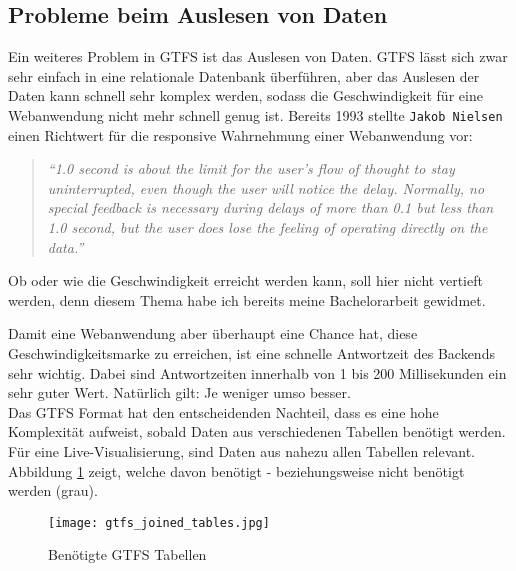 
        \subsection*{Probleme beim Auslesen von Daten}
        \label{sub:subsection_name}
        Ein weiteres Problem in GTFS ist das Auslesen von Daten. GTFS lässt sich zwar sehr einfach in eine relationale Datenbank überführen, aber das Auslesen der Daten kann schnell sehr komplex werden, sodass die Geschwindigkeit für eine Webanwendung nicht mehr schnell genug ist. Bereits 1993 stellte \texttt{Jakob Nielsen} einen Richtwert für die responsive Wahrnehmung einer Webanwendung vor:

        \begin{quote}
          \textit{"`1.0 second is about the limit for the user's flow of thought to stay uninterrupted, even though the user will notice the delay. Normally, no special feedback is necessary during delays of more than 0.1 but less than 1.0 second, but the user does lose the feeling of operating directly on the data."'}\parencite{nielsen}
        \end{quote}

        Ob oder wie die Geschwindigkeit erreicht werden kann, soll hier nicht vertieft werden, denn diesem Thema habe ich bereits meine Bachelorarbeit gewidmet\parencite{lorer}.

        Damit eine Webanwendung aber überhaupt eine Chance hat, diese Geschwindigkeitsmarke zu erreichen, ist eine schnelle Antwortzeit des Backends sehr wichtig. Dabei sind Antwortzeiten innerhalb von 1 bis 200 Millisekunden ein sehr guter Wert. Natürlich gilt: Je weniger umso besser.\\

        Das GTFS Format hat den entscheidenden Nachteil, dass es eine hohe Komplexität aufweist, sobald Daten aus verschiedenen Tabellen benötigt werden. Für eine Live-Visualisierung, sind Daten aus nahezu allen Tabellen relevant. Abbildung \ref{fig:gtfs_joined_tables} zeigt, welche davon benötigt - beziehungsweise nicht benötigt werden (grau).

        \begin{figure}[ht]
          \begin{center}
            \texttt{[image: gtfs\_joined\_tables.jpg]}
            \caption{Benötigte GTFS Tabellen\parencite{google_gtfs_reference}}
            \label{fig:gtfs_joined_tables}
          \end{center}
        \end{figure}

